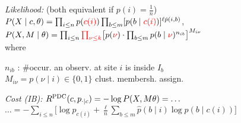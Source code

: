 \emph{Likelihood:}\enspace
(both equivalent if $p(i)=\frac1n$)\\
\enspace $P(X\mid c,\theta) = \prod_{i\leq n} p(\textcolor{red}{c(i)}) \prod_{b\leq m} [p(b\mid \textcolor{red}{c(i)})]^{\ell \hat p(i,b)}$,\\
\enspace $P(X,M\mid \theta) = \prod_{i\leq n} \textcolor{red}{\prod_{\nu\leq k}} \big[ p(\textcolor{red}{\nu}) \cdot \prod_{b\leq m} p(b\mid\textcolor{red}{\nu})^{n_{ib}} \big]^{M_{i\nu}}$
\\
where\enskip
\begin{minipage}[t]{\linewidth-\widthof{where\enskip}}
    $n_{ib}$ : \#occur. an observ. at site $i$ is inside $I_b$ \\
    $M_{i\nu} = p(\nu\mid i) \in \{0,1\}$ \enskip clust. membersh. assign.
\end{minipage}

\emph{Cost (IB):}\enspace
$R^\mathrm{PDC}(c, p_{\cdot\mid c}) = -\log P(X,M\theta) = \ldots$
\hfill $\ldots = -\sum_{i\leq n} \big[ \log p_{c(i)} + \frac{\ell}{n} \sum_{b\leq m} \hat p(b\mid i) \log p(b\mid c(i)) \big]$\\


